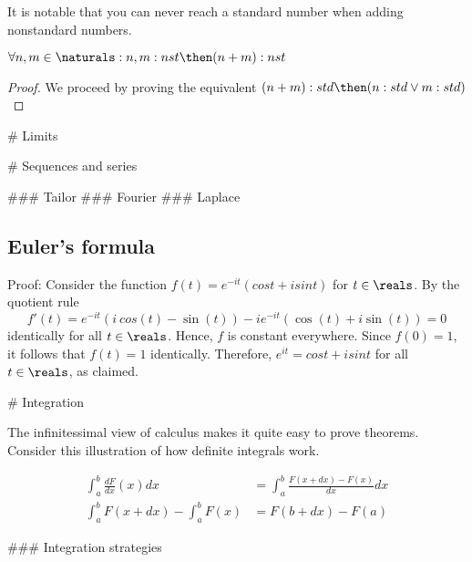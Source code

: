 It is notable that you can never reach a standard number when adding nonstandard numbers.
\begin{theorem}
    $ \forall n,m \in \naturals: n,m:nst \then (n+m):nst $
\end{theorem}
\begin{proof}
    We proceed by proving the equivalent $ (n+m):std \then (n:std \lor m:std) $ 
\end{proof}


# Limits

# Sequences and series

### Tailor
### Fourier
### Laplace

\subsection{Euler's formula}
Proof: Consider the function $f(t)=e^{-it}(cost+isint)$ for $t \in \reals$. By the quotient rule
$$ f'(t) = e^{-it} (i\ cos(t) - \sin(t)) -ie^{-it} (\cos(t) + i \sin(t)) = 0 $$
identically for all $t \in \reals$. Hence, $f$ is constant everywhere. Since $f(0)=1$, it follows that $f(t)=1$ identically. Therefore, $e^{it}=cost+isint$ for all $t \in \reals$, as claimed.


# Integration

The infinitessimal view of calculus makes it quite easy to prove theorems. Consider this illustration of how definite integrals work.

\begin{equation}
    \begin{aligned}
        \int_a^b \frac{dF}{dx}(x) dx &= \int_a^b \frac{F(x + dx) - F(x)}{dx} dx \\
        \int_a^b F(x + dx) - \int_a^b F(x) &= F(b + dx) - F(a)
    \end{aligned}
\end{equation}


### Integration strategies

